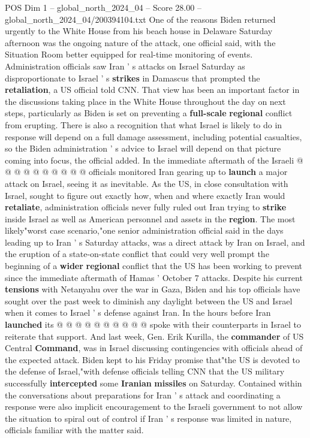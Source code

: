 \begin{textsample}{POS Dim 1 – global\_north\_2024\_04 – Score 28.00 – global\_north\_2024\_04/200394104.txt}
One of the reasons Biden returned urgently to the White House from his beach house in Delaware Saturday afternoon was the ongoing nature of the attack, one official said, with the Situation Room better equipped for real-time monitoring of events.
Administration officials saw Iran ' s attacks on Israel Saturday as disproportionate to Israel ' s \textbf{strikes} in Damascus that prompted the \textbf{retaliation}, a US official told CNN.
That view has been an important factor in the discussions taking place in the White House throughout the day on next steps, particularly as Biden is set on preventing a \textbf{full-scale} \textbf{regional} conflict from erupting.
There is also a recognition that what Israel is likely to do in response will depend on a full damage assessment, including potential casualties, so the Biden administration ' s advice to Israel will depend on that picture coming into focus, the official added.
In the immediate aftermath of the Israeli @ @ @ @ @ @ @ @ @ @ officials monitored Iran gearing up to \textbf{launch} a major attack on Israel, seeing it as inevitable.
As the US, in close consultation with Israel, sought to figure out exactly how, when and where exactly Iran would \textbf{retaliate}, administration officials never fully ruled out Iran trying to \textbf{strike} inside Israel as well as American personnel and assets in the \textbf{region}.
The most likely"worst case scenario,"one senior administration official said in the days leading up to Iran ' s Saturday attacks, was a direct attack by Iran on Israel, and the eruption of a state-on-state conflict that could very well prompt the beginning of a \textbf{wider} \textbf{regional} conflict that the US has been working to prevent since the immediate aftermath of Hamas ' October 7 attacks.
Despite his current \textbf{tensions} with Netanyahu over the war in Gaza, Biden and his top officials have sought over the past week to diminish any daylight between the US and Israel when it comes to Israel ' s defense against Iran.
In the hours before Iran \textbf{launched} its @ @ @ @ @ @ @ @ @ @ spoke with their counterparts in Israel to reiterate that support.
And last week, Gen.
Erik Kurilla, the \textbf{commander} of US Central \textbf{Command}, was in Israel discussing contingencies with officials ahead of the expected attack.
Biden kept to his Friday promise that"the US is devoted to the defense of Israel,"with defense officials telling CNN that the US military successfully \textbf{intercepted} some \textbf{Iranian} \textbf{missiles} on Saturday.
Contained within the conversations about preparations for Iran ' s attack and coordinating a response were also implicit encouragement to the Israeli government to not allow the situation to spiral out of control if Iran ' s response was limited in nature, officials familiar with the matter said.

\end{textsample}
